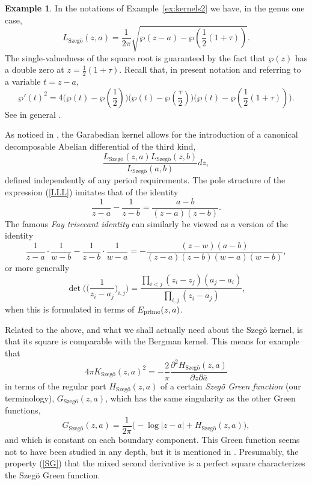 \documentclass[reqno,12pt]{article}
\theoremstyle{plain}
\theoremstyle{definition}
\newtheorem{example}[defn]{Example}
\numberwithin{equation}{section}
\numberwithin{figure}{section}
\begin{document}
\begin{example}
In the notations of Example~\ref{ex:kernels2} we have, in the genus one case,
$$
L_\text{Szeg\"o}(z,a)=\frac{1}{2\pi}\sqrt{\wp(z-a)-\wp(\frac{1}{2}(1+\tau))}.
$$
The single-valuedness of the square root is guaranteed by the fact that $\wp(z)$ has a double zero at $z=\frac{1}{2}(1+\tau)$.
Recall that, in present notation and referring to a variable $t=z-a$,
$$
\wp'(t)^2=4\big(\wp(t)-\wp(\frac{1}{2})\big)\big(\wp(t)-\wp(\frac{\tau}{2})\big)\big(\wp(t)-\wp(\frac{1}{2}(1+\tau))\big).
$$
See in general \cite{Ahlfors-1966}. 
\end{example}

As noticed in \cite{Hawley-Schiffer-1966}, the Garabedian kernel allows for the introduction of a canonical decomposable
Abelian differential of the third kind,
\begin{equation}\label{LLL}
\frac{L_\text{Szeg\"o}(z,a)L_\text{Szeg\"o}(z,b)}{L_\text{Szeg\"o}(a,b)}dz,
\end{equation}
defined independently of any period requirements.
The pole structure of the expression (\ref{LLL}) imitates that of the identity
\begin{equation*}\label{elementary1}
\frac{1}{z-a}-\frac{1}{z-b}=\frac{a-b}{(z-a)(z-b)}.
\end{equation*}
The famous {\it Fay trisecant identity} \cite{Fay-1973, Raina-1989} can similarly be viewed as a version of the identity
\begin{equation*}\label{elementary2}
\frac{1}{z-a}\cdot \frac{1}{w-b}-\frac{1}{z-b}\cdot \frac{1}{w-a}
=-\frac{(z-w)(a-b)}{(z-a)(z-b)(w-a)(w-b)},
\end{equation*}
or more generally
$$
\det \Big( \big(\frac{1}{z_i-a_j}\big)_{i,j}\Big)=\frac{\prod_{i<j}(z_i-z_j)(a_j-a_i)}{\prod_{i,j}(z_i-a_j)},
$$
when this is formulated in terms of $E_{\rm prime}(z,a)$.

Related to the above, and what we shall actually need about the Szeg\"o kernel,
 is that its square is comparable with the Bergman kernel. This means for example that
\begin{equation}\label{SG}
4\pi K_\text{Szeg\"o}(z,a)^2= -\frac{2}{\pi}\frac{\partial^2 H_\text{Szeg\"o}(z,a)}{\partial z \partial \bar{a}}
\end{equation}
in terms of the regular part $H_{\text{Szeg\"o}}(z,a)$ of a certain {\it Szeg\"o Green function} (our terminology), $G_\text{Szeg\"o}(z,a)$, which has the same singularity 
as the other Green functions, 
\begin{equation}\label{GSzegoH}
G_\text{Szeg\"o}(z,a)=\frac{1}{2\pi}\big(-\log |z-a| + H_\text{Szeg\"o}(z,a)\big),
\end{equation}
and which is constant on each boundary component. 
This Green function seems not to have been studied in any depth, but it is mentioned in \cite{Garabedian-1949}.
Presumably, the property (\ref{SG}) that the mixed second derivative is a perfect square characterizes the
Szeg\"o Green function. 
\end{document}
